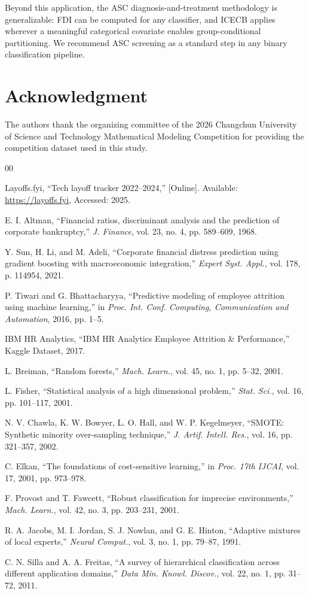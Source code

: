 \documentclass[conference]{IEEEtran}
\begin{document}
Beyond this application, the ASC diagnosis-and-treatment methodology is generalizable: FDI can be computed for any classifier, and ICECB applies wherever a meaningful categorical covariate enables group-conditional partitioning. We recommend ASC screening as a standard step in any binary classification pipeline.

\section*{Acknowledgment}
The authors thank the organizing committee of the 2026 Changchun University of Science and Technology Mathematical Modeling Competition for providing the competition dataset used in this study.

\begin{thebibliography}{00}

 Layoffs.fyi, ``Tech layoff tracker 2022--2024,'' [Online]. Available: \url{https://layoffs.fyi}, Accessed: 2025.

 E. I. Altman, ``Financial ratios, discriminant analysis and the prediction of corporate bankruptcy,'' \textit{J. Finance}, vol. 23, no. 4, pp. 589--609, 1968.

 Y. Sun, H. Li, and M. Adeli, ``Corporate financial distress prediction using gradient boosting with macroeconomic integration,'' \textit{Expert Syst. Appl.}, vol. 178, p. 114954, 2021.

 P. Tiwari and G. Bhattacharyya, ``Predictive modeling of employee attrition using machine learning,'' in \textit{Proc. Int. Conf. Computing, Communication and Automation}, 2016, pp. 1--5.

 IBM HR Analytics, ``IBM HR Analytics Employee Attrition \& Performance,'' Kaggle Dataset, 2017.

 L. Breiman, ``Random forests,'' \textit{Mach. Learn.}, vol. 45, no. 1, pp. 5--32, 2001.

 L. Fisher, ``Statistical analysis of a high dimensional problem,'' \textit{Stat. Sci.}, vol. 16, pp. 101--117, 2001.

 N. V. Chawla, K. W. Bowyer, L. O. Hall, and W. P. Kegelmeyer, ``SMOTE: Synthetic minority over-sampling technique,'' \textit{J. Artif. Intell. Res.}, vol. 16, pp. 321--357, 2002.

 C. Elkan, ``The foundations of cost-sensitive learning,'' in \textit{Proc. 17th IJCAI}, vol. 17, 2001, pp. 973--978.

 F. Provost and T. Fawcett, ``Robust classification for imprecise environments,'' \textit{Mach. Learn.}, vol. 42, no. 3, pp. 203--231, 2001.

 R. A. Jacobs, M. I. Jordan, S. J. Nowlan, and G. E. Hinton, ``Adaptive mixtures of local experts,'' \textit{Neural Comput.}, vol. 3, no. 1, pp. 79--87, 1991.

 C. N. Silla and A. A. Freitas, ``A survey of hierarchical classification across different application domains,'' \textit{Data Min. Knowl. Discov.}, vol. 22, no. 1, pp. 31--72, 2011.

\end{thebibliography}
\end{document}
